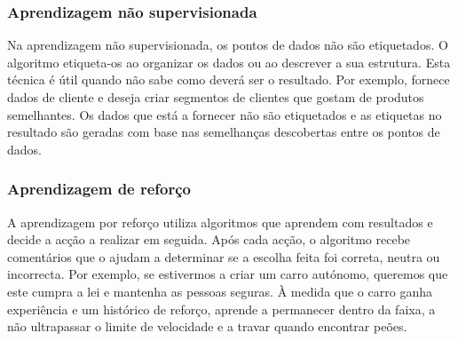 \subsubsection{Aprendizagem não supervisionada}

Na aprendizagem não supervisionada, os pontos de dados não são etiquetados.
O algoritmo etiqueta-os ao organizar os dados ou ao descrever a sua estrutura.
Esta técnica é útil quando não sabe como deverá ser o resultado.
Por exemplo, fornece dados de cliente e deseja criar segmentos de clientes que gostam de produtos semelhantes.
Os dados que está a fornecer não são etiquetados e as etiquetas no resultado são geradas com base nas semelhanças descobertas entre os pontos de dados.

\subsubsection{Aprendizagem de reforço}

A aprendizagem por reforço utiliza algoritmos que aprendem com resultados e decide a acção a realizar em seguida.
Após cada acção, o algoritmo recebe comentários que o ajudam a determinar se a escolha feita foi correta, neutra ou incorrecta.
Por exemplo, se estivermos a criar um carro autónomo, queremos que este cumpra a lei e mantenha as pessoas seguras.
À medida que o carro ganha experiência e um histórico de reforço, aprende a permanecer dentro da faixa, a não ultrapassar o limite de velocidade e a travar quando encontrar peões.

